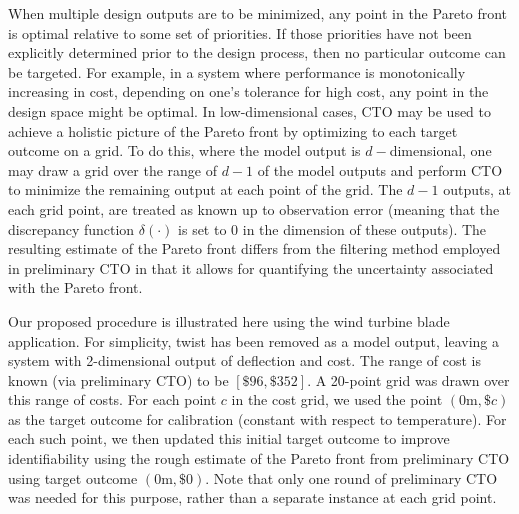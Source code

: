 \documentclass[12pt]{article}
\begin{document}
%
When multiple design outputs are to be minimized, any point in the Pareto front is optimal relative to some set of priorities.
%
If those priorities have not been explicitly determined prior to the design process, then no particular outcome can be targeted.
%
%
For example, in a system where performance is monotonically increasing in cost, depending on one's tolerance for high cost, any point in the design space might be optimal.
%
%
In low-dimensional cases, CTO may be used to achieve a holistic picture of the Pareto front by optimizing to each target outcome on a grid.
%
To do this, where the model output is $d-$dimensional, one may draw a grid over the range of $d-1$ of the model outputs and perform CTO to minimize the remaining output at each point of the grid.
%
The $d-1$ outputs, at each grid point, are treated as known up to observation error (meaning that the discrepancy function $\delta(\cdot)$ is set to 0 in the dimension of these outputs).
%
The resulting estimate of the Pareto front differs from the filtering method employed in preliminary CTO in that it allows for quantifying the uncertainty associated with the Pareto front.
%

Our proposed procedure is illustrated here using the wind turbine blade application.
%
For simplicity, twist has been removed as a model output, leaving a system with 2-dimensional output of deflection and cost. 
%
The range of cost is known (via preliminary CTO) to be $[\$96,\$352]$.
%
A 20-point grid was drawn over this range of costs. 
%
%
For each point $c$ in the cost grid, we used the point $(0\mathrm m,\$c)$ as the target outcome for calibration (constant with respect to temperature).
%
For each such point, we then updated this initial target outcome to improve identifiability using the rough estimate of the Pareto front from preliminary CTO using target outcome $(0\mathrm m,\$0)$.
%
Note that only one round of preliminary CTO was needed for this purpose, rather than a separate instance at each grid point.
%
\end{document}
